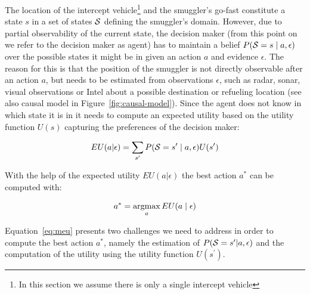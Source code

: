 \documentclass[conference]{IEEEtran}
\begin{document}
The location of the intercept vehicle\footnote{In this section we assume there is only a single intercept vehicle} and the smuggler's go-fast constitute a state $s$ in a set of states $\S$ defining the smuggler's domain. However, due to partial observability of the current state, the decision maker (from this point on we refer to the decision maker as  agent) has to maintain a belief $P(\S = s \mid  a, \epsilon)$ over the possible states it might be in given an action $a$ and evidence $\epsilon$. The reason for this is that the position of the smuggler is not directly observable after an action $a$, but needs to be estimated from observations $\epsilon$, such as radar, sonar, visual observations or Intel about a possible destination or refueling location (see also causal model in Figure~\ref{fig:causal-model}). Since the agent does not know in which state it is in it needs to compute an expected utility based on the utility function $U(s)$ capturing the preferences of the decision maker:

\begin{eqnarray}
 EU(a|\epsilon) = \sum_{s^\prime}P(\S = s^\prime\mid a, \epsilon)U(s^\prime)
\end{eqnarray}

With the help of the expected utility $EU(a|\epsilon)$ the best action $a^*$ can be computed with:

\begin{eqnarray}\label{eq:meu}
 a^* = \argmax_a EU(a\mid \epsilon)
\end{eqnarray}

Equation~\ref{eq:meu} presents two challenges we need to address in order to compute the best action $a^*$, namely the estimation of $P(\S = s^\prime|a, \epsilon)$ and the computation of the utility using the utility function $U(s^\prime)$.

\end{document}
